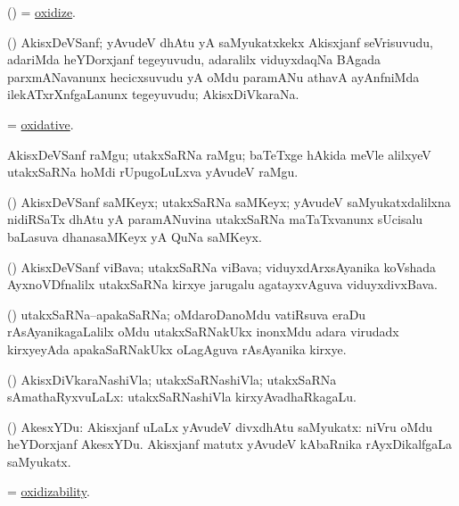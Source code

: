 \bentry
{}
\gl{\kirx}
\bmng
(\ravi) = \hyperlink{oxidize}{oxidize}. 
\emng
\eentry

\bentry
{}
\gl{\nA}
\bmng
(\ravi) AkisxDeVSanf; yAvudeV dhAtu yA saMyukatxkekx Akisxjanf seVrisuvudu, adariMda heYDorxjanf tegeyuvudu, adaralilx viduyxdaqNa BAgada parxmANavanunx hecicxsuvudu yA oMdu paramANu athavA ayAnfniMda ilekATxrXnfgaLanunx tegeyuvudu; AkisxDiVkaraNa. 
\emng
\eentry

\bentry
{}
\gl{\gu}
\bmng
= \hyperlink{oxidative}{oxidative}. 
\emng
\eentry

\bentry
{}
\gl{\nA}
\bmng
AkisxDeVSanf raMgu; utakxSaRNa raMgu; baTeTxge hAkida meVle alilxyeV utakxSaRNa hoMdi rUpugoLuLxva yAvudeV raMgu. 
\emng
\eentry

\bentry
{}
\gl{\nA}
\bmng
(\ravi) AkisxDeVSanf saMKeyx; utakxSaRNa saMKeyx; yAvudeV saMyukatxdalilxna nidiRSaTx dhAtu yA paramANuvina utakxSaRNa maTaTxvanunx sUcisalu baLasuva dhanasaMKeyx yA QuNa saMKeyx. 
\emng
\eentry

\bentry
{}
\gl{\nA}
\bmng
(\ravi) AkisxDeVSanf viBava; utakxSaRNa viBava; viduyxdArxsAyanika koVshada AyxnoVDfnalilx utakxSaRNa kirxye jarugalu agatayxvAguva viduyxdivxBava. 
\emng
\eentry

\bentry
{}
\gl{\nA}
\bmng
(\ravi) utakxSaRNa--apakaSaRNa; oMdaroDanoMdu vatiRsuva eraDu rAsAyanikagaLalilx oMdu utakxSaRNakUkx inonxMdu adara virudadx kirxyeyAda apakaSaRNakUkx oLagAguva rAsAyanika kirxye. 
\emng
\eentry

\bentry
{}
\gl{\gu}
\bmng
(\ravi) AkisxDiVkaraNashiVla; utakxSaRNashiVla; utakxSaRNa sAmathaRyxvuLaLx:  utakxSaRNashiVla kirxyAvadhaRkagaLu. 
\emng
\eentry

\bentry
{}
\gl{\nA}
\bmng
(\ravi) AkesxYDu: 
\banum
{} Akisxjanf uLaLx yAvudeV divxdhAtu saMyukatx:  niVru oMdu heYDorxjanf AkesxYDu. 
 Akisxjanf matutx yAvudeV kAbaRnika rAyxDikalfgaLa saMyukatx. 
\eanum
\emng
\eentry

\bentry
{}
\gl{\nA}
\bmng
= \hyperlink{oxidizability}{oxidizability}. 
\emng
\eentry

